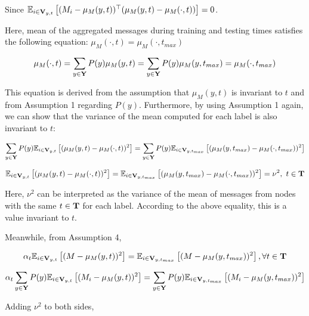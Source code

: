 Since $\mathbb{E}_{i\in \bold{V}_{y,t}}\left[ (M_i - \mu_M(y,t))^{\top}(\mu_M(y,t)-\mu_M(\cdot,t))\right]=0$.

Here, mean of the aggregated messages during training and testing times satisfies the following equation: $\mu_M(\cdot,t) = \mu_M(\cdot,t_{max})$

\begin{align}
\mu_M(\cdot,t)=\sum_{y\in\bold{Y}}P(y)\mu_M(y,t)=\sum_{y\in\bold{Y}}P(y)\mu_M(y,t_{max})=\mu_M(\cdot,t_{max})
\end{align}

This equation is derived from the assumption that $\mu_M(y,t)$ is invariant to $t$ and from Assumption 1 regarding $P(y)$. Furthermore, by using Assumption 1 again, we can show that the variance of the mean computed for each label is also invariant to $t$:

\begin{align}
\sum_{y\in\bold{Y}}P(y)\mathbb{E}_{i\in \bold{V}_{y,t}}\left[(\mu_M(y,t)-\mu_M(\cdot,t))^2 \right]=\sum_{y\in\bold{Y}}P(y)\mathbb{E}_{i\in \bold{V}_{y,t_{max}}}\left[(\mu_M(y,t_{max})-\mu_M(\cdot,t_{max}))^2 \right]
\end{align}

\begin{align}
\mathbb{E}_{i\in \bold{V}_{y,t}}\left[(\mu_M(y,t)-\mu_M(\cdot,t))^2 \right]=\mathbb{E}_{i\in \bold{V}_{y,t_{max}}}\left[(\mu_M(y,t_{max})-\mu_M(\cdot,t_{max}))^2\right] =\nu^2,\ t\in \bold{T}
\end{align}

Here, $\nu^2$ can be interpreted as the variance of the mean of messages from nodes with the same $t\in \bold{T}$ for each label. According to the above equality, this is a value invariant to $t$.

Meanwhile, from Assumption 4,

\begin{align}
\alpha_t \mathbb{E}_{i\in \bold{V}_{y,t}}\left[ (M - \mu_M(y,t))^2 \right] = \mathbb{E}_{i\in \bold{V}_{y,t_{max}}}\left[ (M - \mu_M(y,t_{max}))^2\right], \forall t\in \bold{T}
\end{align}

\begin{align}
\alpha_t\sum_{y\in\bold{Y}}P(y)\mathbb{E}_{i\in \bold{V}_{y,t}}\left[ (M_i - \mu_M(y,t))^2 \right]=\sum_{y\in\bold{Y}}P(y)\mathbb{E}_{i\in \bold{V}_{y,t_{max}}}\left[ (M_i - \mu_M(y,t_{max}))^2\right]
\end{align}

Adding $\nu^2$ to both sides,


